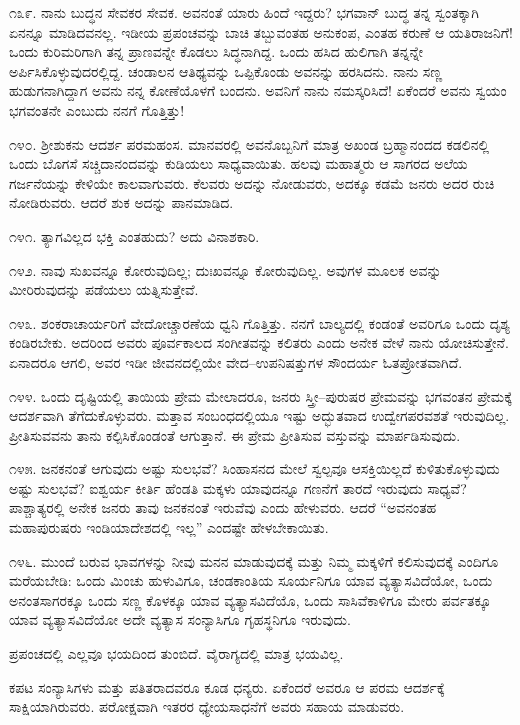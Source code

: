 ೧೩೯. ನಾನು ಬುದ್ಧನ ಸೇವಕರ ಸೇವಕ. ಅವನಂತೆ ಯಾರು ಹಿಂದೆ ಇದ್ದರು? ಭಗವಾನ್ ಬುದ್ಧ ತನ್ನ ಸ್ವಂತಕ್ಕಾಗಿ ಏನನ್ನೂ ಮಾಡಿದವನಲ್ಲ. ಇಡೀಯ ಪ್ರಪಂಚವನ್ನು ಬಾಚಿ ತಬ್ಬುವಂತಹ ಅನುಕಂಪ, ಎಂತಹ ಕರುಣೆ ಆ ಯತಿರಾಜನಿಗೆ! ಒಂದು ಕುರಿಮರಿಗಾಗಿ ತನ್ನ ಪ್ರಾಣವನ್ನೇ ಕೊಡಲು ಸಿದ್ಧನಾಗಿದ್ದ. ಒಂದು ಹಸಿದ ಹುಲಿಗಾಗಿ ತನ್ನನ್ನೇ ಅರ್ಪಿಸಿಕೊಳ್ಳುವುದರಲ್ಲಿದ್ದ. ಚಂಡಾಲನ ಆತಿಥ್ಯವನ್ನು ಒಪ್ಪಿಕೊಂಡು ಅವನನ್ನು ಹರಸಿದನು. ನಾನು ಸಣ್ಣ ಹುಡುಗನಾಗಿದ್ದಾಗ ಅವನು ನನ್ನ ಕೋಣೆಯೊಳಗೆ ಬಂದನು. ಅವನಿಗೆ ನಾನು ನಮಸ್ಕರಿಸಿದೆ! ಏಕೆಂದರೆ ಅವನು ಸ್ವಯಂ ಭಗವಂತನೇ ಎಂಬುದು ನನಗೆ ಗೊತ್ತಿತ್ತು!

೧೪೦. ಶ‍್ರೀಶುಕನು ಆದರ್ಶ ಪರಮಹಂಸ. ಮಾನವರಲ್ಲಿ ಅವನೊಬ್ಬನಿಗೆ ಮಾತ್ರ ಅಖಂಡ ಬ್ರಹ್ಮಾನಂದದ ಕಡಲಿನಲ್ಲಿ ಒಂದು ಬೊಗಸೆ ಸಚ್ಚಿದಾನಂದವನ್ನು ಕುಡಿಯಲು ಸಾಧ್ಯವಾಯಿತು. ಹಲವು ಮಹಾತ್ಮರು ಆ ಸಾಗರದ ಅಲೆಯ ಗರ್ಜನೆಯನ್ನು ಕೇಳಿಯೇ ಕಾಲವಾಗುವರು. ಕೆಲವರು ಅದನ್ನು ನೋಡುವರು, ಅದಕ್ಕೂ ಕಡಮೆ ಜನರು ಅದರ ರುಚಿ ನೋಡಿರುವರು. ಆದರೆ ಶುಕ ಅದನ್ನು ಪಾನಮಾಡಿದ.

೧೪೧. ತ್ಯಾಗವಿಲ್ಲದ ಭಕ್ತಿ ಎಂತಹುದು? ಅದು ವಿನಾಶಕಾರಿ.

೧೪೨. ನಾವು ಸುಖವನ್ನೂ ಕೋರುವುದಿಲ್ಲ; ದುಃಖವನ್ನೂ ಕೋರುವುದಿಲ್ಲ. ಅವುಗಳ ಮೂಲಕ ಅವನ್ನು ಮೀರಿರುವುದನ್ನು ಪಡೆಯಲು ಯತ್ನಿಸುತ್ತೇವೆ.

೧೪೩. ಶಂಕರಾಚಾರ್ಯರಿಗೆ ವೇದೋಚ್ಚಾರಣೆಯ ಧ್ವನಿ ಗೊತ್ತಿತ್ತು. ನನಗೆ ಬಾಲ್ಯದಲ್ಲಿ ಕಂಡಂತೆ ಅವರಿಗೂ ಒಂದು ದೃಶ್ಯ ಕಂಡಿರಬೇಕು. ಅದರಿಂದ ಅವರು ಪೂರ್ವಕಾಲದ ಸಂಗೀತವನ್ನು ಕಲಿತರು ಎಂದು ಅನೇಕ ವೇಳೆ ನಾನು ಯೋಚಿಸುತ್ತೇನೆ. ಏನಾದರೂ ಆಗಲಿ, ಅವರ ಇಡೀ ಜೀವನದಲ್ಲಿಯೇ ವೇದ–ಉಪನಿಷತ್ತುಗಳ ಸೌಂದರ್ಯ ಓತಪ್ರೋತವಾಗಿದೆ.

೧೪೪. ಒಂದು ದೃಷ್ಟಿಯಲ್ಲಿ ತಾಯಿಯ ಪ್ರೇಮ ಮೇಲಾದರೂ, ಜನರು ಸ್ತ್ರೀ–ಪುರುಷರ ಪ್ರೇಮವನ್ನು ಭಗವಂತನ ಪ್ರೇಮಕ್ಕೆ ಆದರ್ಶವಾಗಿ ತೆಗೆದುಕೊಳ್ಳುವರು. ಮತ್ತಾವ ಸಂಬಂಧದಲ್ಲಿಯೂ ಇಷ್ಟು ಅದ್ಭುತವಾದ ಉದ್ವೇಗಪರವಶತೆ ಇರುವುದಿಲ್ಲ. ಪ್ರೀತಿಸುವವನು ತಾನು ಕಲ್ಪಿಸಿಕೊಂಡಂತೆ ಆಗುತ್ತಾನೆ. ಈ ಪ್ರೇಮ ಪ್ರೀತಿಸುವ ವಸ್ತುವನ್ನು ಮಾರ್ಪಡಿಸುವುದು.

೧೪೫. ಜನಕನಂತೆ ಆಗುವುದು ಅಷ್ಟು ಸುಲಭವೆ? ಸಿಂಹಾಸನದ ಮೇಲೆ ಸ್ವಲ್ಪವೂ ಆಸಕ್ತಿಯಿಲ್ಲದೆ ಕುಳಿತುಕೊಳ್ಳುವುದು ಅಷ್ಟು ಸುಲಭವೆ? ಐಶ್ವರ್ಯ ಕೀರ್ತಿ ಹೆಂಡತಿ ಮಕ್ಕಳು ಯಾವುದನ್ನೂ ಗಣನೆಗೆ ತಾರದೆ ಇರುವುದು ಸಾಧ್ಯವೆ? ಪಾಶ್ಚಾತ್ಯರಲ್ಲಿ ಅನೇಕ ಜನರು ತಾವು ಜನಕನಂತೆ ಇರುವೆವು ಎಂದು ಹೇಳುವರು. ಆದರೆ “ಅವನಂತಹ ಮಹಾಪುರುಷರು ಇಂಡಿಯಾದೇಶದಲ್ಲಿ ಇಲ್ಲ” ಎಂದಷ್ಟೇ ಹೇಳಬೇಕಾಯಿತು.

೧೪೬. ಮುಂದೆ ಬರುವ ಭಾವಗಳನ್ನು ನೀವು ಮನನ ಮಾಡುವುದಕ್ಕೆ ಮತ್ತು ನಿಮ್ಮ ಮಕ್ಕಳಿಗೆ ಕಲಿಸುವುದಕ್ಕೆ ಎಂದಿಗೂ ಮರೆಯಬೇಡಿ: ಒಂದು ಮಿಂಚು ಹುಳುವಿಗೂ, ಚಂಡಕಾಂತಿಯ ಸೂರ್ಯನಿಗೂ ಯಾವ ವ್ಯತ್ಯಾಸವಿದೆಯೋ, ಒಂದು ಅನಂತಸಾಗರಕ್ಕೂ ಒಂದು ಸಣ್ಣ ಕೊಳಕ್ಕೂ ಯಾವ ವ್ಯತ್ಯಾಸವಿದೆಯೊ, ಒಂದು ಸಾಸಿವೆಕಾಳಿಗೂ ಮೇರು ಪರ್ವತಕ್ಕೂ ಯಾವ ವ್ಯತ್ಯಾಸವಿದೆಯೋ ಅದೇ ವ್ಯತ್ಯಾಸ ಸಂನ್ಯಾಸಿಗೂ ಗೃಹಸ್ಥನಿಗೂ ಇರುವುದು.

ಪ್ರಪಂಚದಲ್ಲಿ ಎಲ್ಲವೂ ಭಯದಿಂದ ತುಂಬಿದೆ. ವೈರಾಗ್ಯದಲ್ಲಿ ಮಾತ್ರ ಭಯವಿಲ್ಲ.

ಕಪಟ ಸಂನ್ಯಾಸಿಗಳು ಮತ್ತು ಪತಿತರಾದವರೂ ಕೂಡ ಧನ್ಯರು. ಏಕೆಂದರೆ ಅವರೂ ಆ ಪರಮ ಆದರ್ಶಕ್ಕೆ ಸಾಕ್ಷಿಯಾಗಿರುವರು. ಪರೋಕ್ಷವಾಗಿ ಇತರರ ಧ್ಯೇಯಸಾಧನೆಗೆ ಅವರು ಸಹಾಯ ಮಾಡುವರು.

